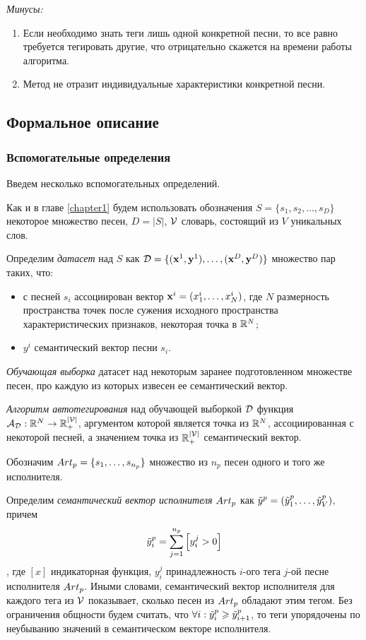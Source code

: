 \emph{Минусы:} 
\begin{enumerate}
 \item Если необходимо знать теги лишь одной конкретной песни, то все равно требуется тегировать другие, что отрицательно скажется на времени работы алгоритма.
 \item Метод не отразит индивидуальные характеристики конкретной песни.
\end{enumerate}

\subsection{Формальное описание}

\subsubsection{Вспомогательные определения}

Введем несколько вспомогательных определений.

Как и в главе \ref{chapter1} будем использовать обозначения $S = \{s_1, s_2, \ldots, s_D \}$ \ld некоторое множество песен, $D = |S|$, $ \mathcal{V} $ \ld словарь, состоящий из $V$ уникальных слов.

Определим \emph{датасет} над $S$ как $\mathcal{D} = \{ (\mathbf{x}^1, \mathbf{y}^1), \ldots, (\mathbf{x}^D, \mathbf{y}^D) \}$ \ld множество пар таких, 
что:
\begin{itemize}
 \item с песней $s_i$ ассоциирован вектор $\mathbf{x}^i = (x^i_1, \ldots, x^i_N)$, где $N$ \ld размерность пространства точек после сужения 
 исходного пространства характеристических признаков, \ld некоторая точка в $\mathbb{R}^N$;
 \item $y^i$ \ld семантический вектор песни $s_i$.
\end{itemize}

\emph{Обучающая выборка} \ld датасет над некоторым заранее подготовленном множестве песен, про каждую из которых извесен ее семантический вектор.

\emph{Алгоритм автотегирования} над обучающей выборкой $\mathcal{D}$ \ld функция ${\mathcal{A}}_{\mathcal{D}} : \mathbb{R}^N \rightarrow \mathbb{R}^{|{\mathcal{V}}|}_{+}$,
аргументом которой является точка из $\mathbb{R}^N$, ассоциированная с некоторой песней, а значением \ld точка из $\mathbb{R}^{|{\mathcal{V}}|}_{+}$ \ld семантический вектор.

Обозначим ${Art}_p = \{s_1, \ldots, s_{n_p} \}$ множество из $n_p$ песен одного и того же исполнителя.

Определим \emph{семантический вектор исполнителя} ${Art}_p$ как $\tilde{y}^p = (\tilde{y}^p_1, \ldots, \tilde{y}^p_{V})$, причем 
$$\tilde{y}^p_i = \sum^{n_p}_{j=1} \left [y^j_i > 0 \right ]$$,
где $[x]$ \ld индикаторная функция, $y^j_i$ \ld принадлежность $i$-ого тега $j$-ой песне исполнителя ${Art}_p$. Иными словами, семантический вектор исполнителя
для каждого тега из $\mathcal{V}$ показывает, сколько песен из ${Art}_p$ обладают этим тегом.
Без ограничения общности будем считать, что $\forall i: \tilde{y}^p_i \geqslant \tilde{y}^p_{i+1}$, то теги упорядочены по неубыванию значений в семантическом векторе исполнителя.

